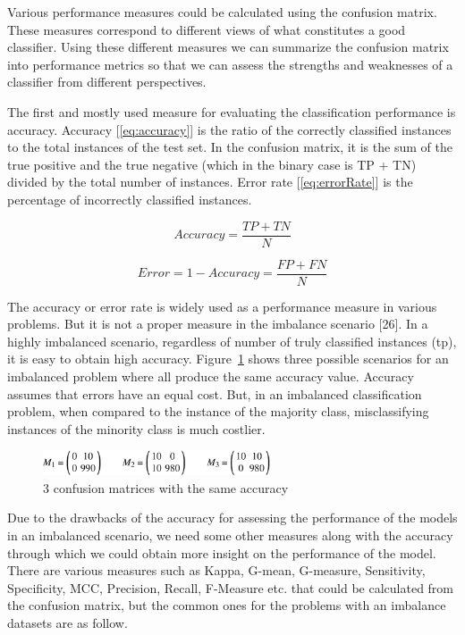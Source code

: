 Various performance measures could be calculated using the confusion matrix. These measures correspond 
to different views of what constitutes a good classifier. Using these different measures we can summarize 
the confusion matrix into performance metrics so that we can assess the strengths and weaknesses of a 
classifier from different perspectives.

The first and mostly used measure for evaluating the classification performance is accuracy. 
Accuracy [\ref{eq:accuracy}] is the ratio of the correctly classified instances to the total instances of 
the test set. In the confusion matrix, it is the sum of the true positive and the true negative 
(which in the binary case is TP + TN) divided by the total number of instances. Error rate [\ref{eq:errorRate}] 
is the percentage of incorrectly classified instances.

\begin{equation}
    Accuracy = \frac{TP+TN}{N} 
    \label{eq:accuracy}
\end{equation}

\begin{equation}
    Error = 1-Accuracy = \frac{FP+FN}{N} 
    \label{eq:errorRate}
\end{equation}

The accuracy or error rate is widely used as a performance measure in various problems. 
But it is not a proper measure in the imbalance scenario [26]. In a highly imbalanced 
scenario, regardless of number of truly classified instances (tp), 
it is easy to obtain high accuracy. Figure~\ref{fig:confusionMatrixSameAccuracy} 
shows three possible scenarios for an imbalanced problem where all produce the same accuracy value. 
Accuracy assumes that errors have an equal cost. But, in an imbalanced classification 
problem, when compared to the instance of the majority class, misclassifying instances 
of the minority class is much costlier.

\begin{figure}[ht]
    \centering
    \includegraphics[width=0.60\textwidth]{figures/11ConfusionSameAccuracy.png}
    \caption{3 confusion matrices with the same accuracy}
    \label{fig:confusionMatrixSameAccuracy}
\end{figure}

Due to the drawbacks of the accuracy for assessing the performance of the models in an 
imbalanced scenario, we need some other measures along with the accuracy through which 
we could obtain more insight on the performance of the model. There are various measures 
such as Kappa, G-mean, G-measure, Sensitivity, Specificity, MCC, Precision, Recall, 
F-Measure etc. that could be calculated from the confusion matrix, but the common ones 
for the problems with an imbalance datasets are as follow.

